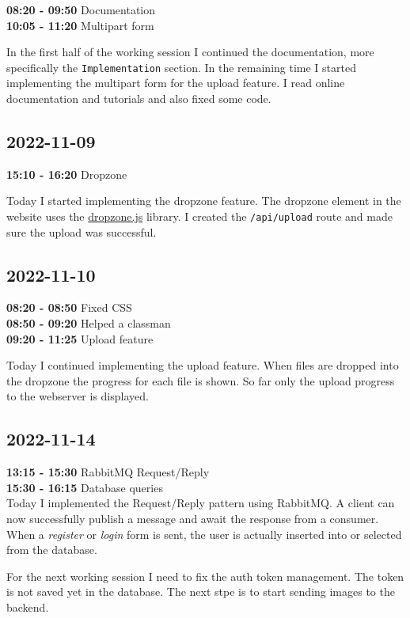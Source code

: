 \documentclass{article}
\begin{document}
\textbf{08:20 - 09:50} Documentation \\
\textbf{10:05 - 11:20} Multipart form

In the first half of the working session I continued the documentation,
more specifically the \texttt{Implementation} section.
In the remaining time I started implementing the multipart form for the
upload feature. I read online documentation and tutorials and also fixed some code.

\subsection{2022-11-09}

\textbf{15:10 - 16:20} Dropzone

Today I started implementing the dropzone feature. The dropzone element
in the website uses the \href{https://www.dropzone.dev}{dropzone.js} library.
I created the \texttt{/api/upload} route and made sure the upload was successful.

\subsection{2022-11-10}

\textbf{08:20 - 08:50} Fixed CSS \\
\textbf{08:50 - 09:20} Helped a classman \\
\textbf{09:20 - 11:25} Upload feature

Today I continued implementing the upload feature.
When files are dropped into the dropzone the progress
for each file is shown. So far only the upload progress to the
webserver is displayed.

\subsection{2022-11-14}

\textbf{13:15 - 15:30} RabbitMQ Request/Reply \\
\textbf{15:30 - 16:15} Database queries \\

Today I implemented the Request/Reply pattern using RabbitMQ.
A client can now successfully publish a message and await the response
from a consumer. When a \textit{register} or \textit{login}
form is sent, the user is actually inserted into or selected from the database.

For the next working session I need to fix the auth token management. The token
is not saved yet in the database.
The next stpe is to start sending images to the backend.
\end{document}
